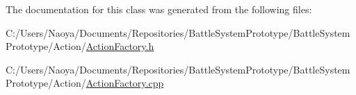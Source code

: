 The documentation for this class was generated from the following files\+:\begin{DoxyCompactItemize}
\item 
C\+:/\+Users/\+Naoya/\+Documents/\+Repositories/\+Battle\+System\+Prototype/\+Battle\+System\+Prototype/\+Action/\hyperlink{_action_factory_8h}{Action\+Factory.\+h}\item 
C\+:/\+Users/\+Naoya/\+Documents/\+Repositories/\+Battle\+System\+Prototype/\+Battle\+System\+Prototype/\+Action/\hyperlink{_action_factory_8cpp}{Action\+Factory.\+cpp}\end{DoxyCompactItemize}
